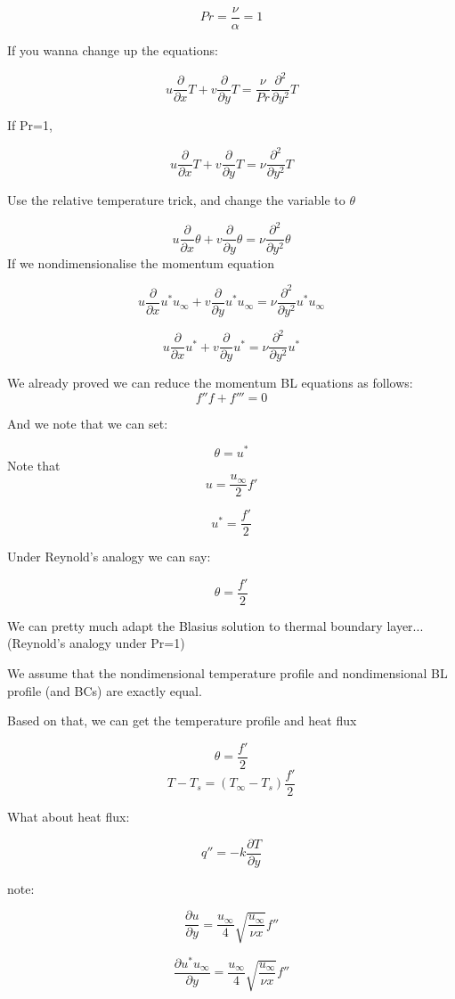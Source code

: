 \documentclass[11pt]{article}
\begin{document}
$$Pr = \frac{\nu}{\alpha} = 1$$

If you wanna change up the equations:

$$ u \frac{\partial}{\partial x} T + v \frac{\partial }{\partial y} T  = \frac{\nu}{Pr} \frac{\partial^2 }{\partial y^2}T  $$ 

If Pr=1,

$$ u \frac{\partial}{\partial x} T + v \frac{\partial }{\partial y} T  = \nu \frac{\partial^2 }{\partial y^2}T  $$ 

Use the relative temperature trick, and change the variable to $\theta$

$$ u \frac{\partial}{\partial x} \theta + v \frac{\partial }{\partial y} \theta  = \nu \frac{\partial^2 }{\partial y^2} \theta  $$ 
If we nondimensionalise the momentum equation

$$u  \frac{\partial}{\partial x } u^* u_\infty + v  \frac{\partial}{\partial y} u^* u_\infty  =  \nu  \frac{\partial^2}{\partial y^2} u^* u_\infty$$

$$u  \frac{\partial}{\partial x } u^*  + v  \frac{\partial}{\partial y} u^*   =  \nu  \frac{\partial^2}{\partial y^2} u^* $$


We already proved we can reduce the momentum BL equations as follows:
$$f''f+f'''=0$$

And we note that we can set:

$$ \theta  = u^*$$
Note that
$$u = \frac{u_\infty}{2} f'$$

$$u^* = \frac{f'}{2}$$

Under Reynold's analogy we can say:

$$\theta = \frac{f'}{2}$$

We can pretty much adapt the Blasius solution to thermal boundary layer... (Reynold's analogy under Pr=1)

We assume that the nondimensional temperature profile and nondimensional BL profile (and BCs) are exactly equal.

Based on that, we can get the temperature profile and heat flux

$$\theta = \frac{f'}{2}$$
$$T-T_s = (T_\infty -T_s) \frac{f'}{2}$$

What about heat flux:

$$q'' = - k \frac{\partial T}{\partial y}$$

note:

$$\frac{\partial u}{\partial y} = \frac{u_\infty}{4} \sqrt{\frac{u_\infty}{\nu x}} f''$$

$$\frac{\partial u^* u_\infty}{\partial y} = \frac{u_\infty}{4} \sqrt{\frac{u_\infty}{\nu x}} f''$$
\end{document}
